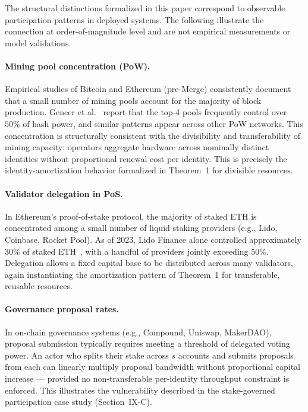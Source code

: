 \documentclass[journal]{IEEEtran}
\begin{document}
	The structural distinctions formalized in this paper
	correspond to observable participation patterns in deployed systems.
	The following illustrate the connection at order-of-magnitude level
	and are not empirical measurements or model validations.
	
	\paragraph{Mining pool concentration (PoW).}
	Empirical studies of Bitcoin and Ethereum (pre-Merge)
	consistently document that a small number of mining pools
	account for the majority of block production.
	Gencer et al.~\cite{gencer2018decentralization} report
	that the top-4 pools frequently control over $50\%$ of
	hash power, and similar patterns appear across
	other PoW networks.
	This concentration is structurally consistent with the
	divisibility and transferability of mining capacity:
	operators aggregate hardware across nominally distinct
	identities without proportional renewal cost per identity.
	This is precisely the identity-amortization behavior
	formalized in Theorem~1 for divisible resources.
	
	\paragraph{Validator delegation in PoS.}
	In Ethereum's proof-of-stake protocol, the majority of
	staked ETH is concentrated among a small number of
	liquid staking providers
	(e.g., Lido, Coinbase, Rocket Pool).
	As of 2023, Lido Finance alone controlled approximately
	$30\%$ of staked ETH~\cite{lido2023concentration},
	with a handful of providers jointly exceeding $50\%$.
	Delegation allows a fixed capital base to be distributed
	across many validators, again instantiating the
	amortization pattern of Theorem~1 for transferable,
	reusable resources.
	
	\paragraph{Governance proposal rates.}
	In on-chain governance systems (e.g., Compound, Uniswap,
	MakerDAO), proposal submission typically requires
	meeting a threshold of delegated voting power.
	An actor who splits their stake across $s$ accounts and
	submits proposals from each can linearly multiply proposal
	bandwidth without proportional capital increase --- provided
	no non-transferable per-identity throughput constraint
	is enforced.
	This illustrates the vulnerability described in the
	stake-governed participation case study (Section~IX-C).
	
\end{document}
